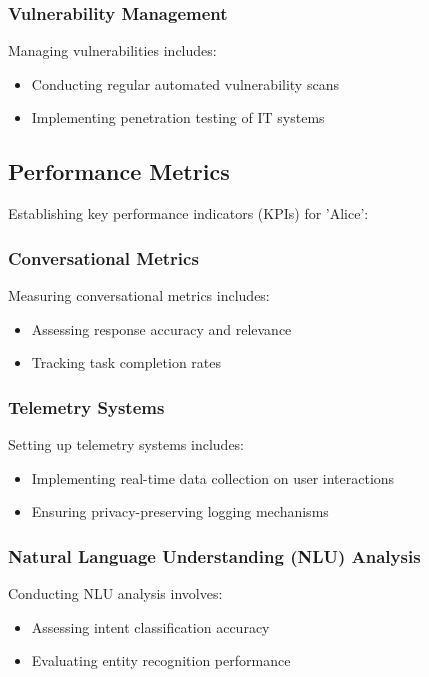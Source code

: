 \documentclass[15pt,a4paper]{article}
\begin{document}
\begin{multicols}{2}
\subsubsection*{Vulnerability Management}
Managing vulnerabilities \textit{\parencite[pp. 150-200]{StuttardPinto2023}} includes:
\begin{itemize}
    \item Conducting regular automated vulnerability scans
    \item Implementing penetration testing of IT systems
\end{itemize}


\subsection{Performance Metrics}
Establishing key performance indicators (KPIs) for 'Alice':

\subsubsection*{Conversational Metrics}
Measuring conversational metrics \textit{\parencite[pp. 1-32]{Quarteroni2024}} includes:
\begin{itemize}
    \item Assessing response accuracy and relevance
    \item Tracking task completion rates
\end{itemize}

\subsubsection*{Telemetry Systems}
Setting up telemetry systems \textit{\parencite[pp. 30-60]{Vadapalli2023}} includes:
\begin{itemize}
    \item Implementing real-time data collection on user interactions
    \item Ensuring privacy-preserving logging mechanisms
\end{itemize}

\subsubsection*{Natural Language Understanding (NLU) Analysis}
Conducting NLU analysis \textit{\parencite[pp. 200-250]{JurafskyMartin2024}} involves:
\begin{itemize}
    \item Assessing intent classification accuracy
    \item Evaluating entity recognition performance
\end{itemize}


\end{multicols}
\end{document}
